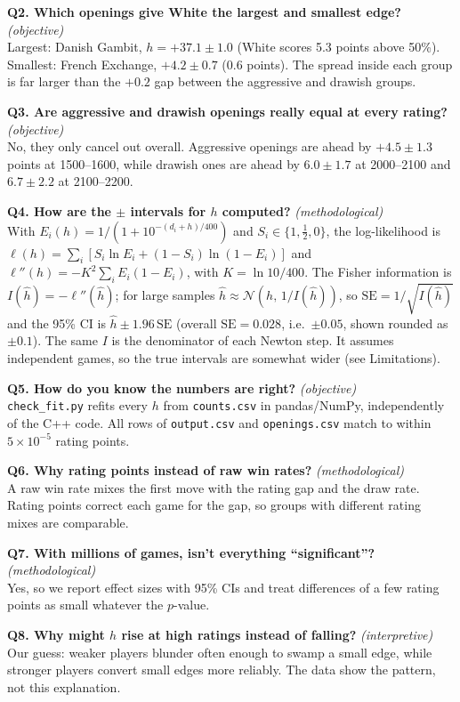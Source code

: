 \documentclass[11pt,a4paper]{article}
\begin{document}
\textbf{Q2. Which openings give White the largest and smallest edge?} \emph{(objective)}\\
Largest: Danish Gambit, $h=+37.1\pm1.0$ (White scores 5.3 points above 50\%). Smallest: French
Exchange, $+4.2\pm0.7$ (0.6 points). The spread inside each group is far larger than the $+0.2$ gap
between the aggressive and drawish groups.

\textbf{Q3. Are aggressive and drawish openings really equal at every rating?} \emph{(objective)}\\
No, they only cancel out overall. Aggressive openings are ahead by $+4.5\pm1.3$ points at
1500--1600, while drawish ones are ahead by $6.0\pm1.7$ at 2000--2100 and $6.7\pm2.2$ at 2100--2200.

\textbf{Q4. How are the $\pm$ intervals for $h$ computed?} \emph{(methodological)}\\
With $E_i(h)=1/(1+10^{-(d_i+h)/400})$ and $S_i\in\{1,\tfrac12,0\}$, the log-likelihood is
$\ell(h)=\sum_i [S_i\ln E_i+(1-S_i)\ln(1-E_i)]$ and $\ell''(h)=-K^2\sum_i E_i(1-E_i)$, with
$K=\ln 10/400$. The Fisher information is $I(\hat h)=-\ell''(\hat h)$; for large samples
$\hat h\approx\mathcal N(h,\,1/I(\hat h))$, so $\mathrm{SE}=1/\sqrt{I(\hat h)}$ and the 95\% CI is
$\hat h\pm1.96\,\mathrm{SE}$ (overall $\mathrm{SE}=0.028$, i.e.\ $\pm0.05$, shown rounded as $\pm0.1$). The same
$I$ is the denominator of each Newton step. It assumes independent games, so the true intervals
are somewhat wider (see Limitations).

\textbf{Q5. How do you know the numbers are right?} \emph{(objective)}\\
\texttt{check\_fit.py} refits every $h$ from \texttt{counts.csv} in pandas/NumPy, independently of
the C++ code. All rows of \texttt{output.csv} and \texttt{openings.csv} match to within
$5\times10^{-5}$ rating points.

\textbf{Q6. Why rating points instead of raw win rates?} \emph{(methodological)}\\
A raw win rate mixes the first move with the rating gap and the draw rate. Rating points correct
each game for the gap, so groups with different rating mixes are comparable.

\textbf{Q7. With millions of games, isn't everything ``significant''?} \emph{(methodological)}\\
Yes, so we report effect sizes with 95\% CIs and treat differences of a few rating points as small
whatever the $p$-value.

\textbf{Q8. Why might $h$ rise at high ratings instead of falling?} \emph{(interpretive)}\\
Our guess: weaker players blunder often enough to swamp a small edge, while stronger players
convert small edges more reliably. The data show the pattern, not this explanation.
\end{document}
